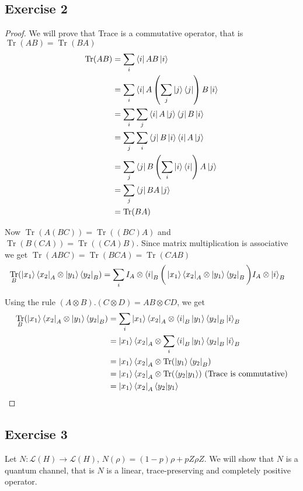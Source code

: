 \documentclass{article}
\DeclareMathOperator{\Tr}{Tr}
\begin{document}
\subsection*{Exercise 2}
\begin{proof}
We will prove that Trace is a commutative operator, that is $\Tr(AB)= \Tr(BA)$
\begin{align*}
    \Tr(AB) &= \sum_i \bra i AB \ket i \\
    &= \sum_i \bra i A \left(\sum_j \ket j \bra j \right)B \ket i \\
    &= \sum_i \sum_j \bra i A \ket j \bra j B \ket i \\
    &= \sum_j \sum_i \bra j B \ket i \bra i A \ket j \\
    &= \sum_j \bra j B \left( \sum_i \ket i \bra i \right) A \ket j \\
    &= \sum_j \bra j BA \ket j \\
    &= \Tr(BA)
\end{align*}

Now $\Tr(A(BC)) = \Tr((BC)A)$ and $\Tr(B(CA)) = \Tr((CA)B)$. Since matrix multiplication is associative we get $\Tr(ABC) = \Tr(BCA) = \Tr(CAB)$ \\

\begin{align*}
    \Tr_B (\ket{x_1} \bra{x_2}_A \otimes \ket{y_1} \bra{y_2}_B) &= \sum_i I_A \otimes \bra{i}_B \bigg( \ket{x_1} \bra{x_2}_A \otimes \ket{y_1} \bra{y_2}_B \bigg) I_A \otimes \ket{i}_B
\end{align*}

Using the rule $(A \otimes B).(C \otimes D) = AB \otimes CD$, we get
\begin{align*}
    \Tr_B (\ket{x_1} \bra{x_2}_A \otimes \ket{y_1} \bra{y_2}_B) &= \sum_i \ket{x_1} \bra{x_2}_A \otimes \bra{i}_B \ket{y_1} \bra{y_2}_B \ket{i}_B \\
    &= \ket{x_1} \bra{x_2}_A \otimes \sum_i \bra{i}_B \ket{y_1} \bra{y_2}_B \ket{i}_B \\
    &= \ket{x_1} \bra{x_2}_A \otimes \Tr (\ket{y_1} \bra{y_2}_B) \\
    &= \ket{x_1} \bra{x_2}_A \otimes \Tr (\braket{y_2 | y_1}) \text{  (Trace is commutative)} \\
    &= \ket{x_1} \bra{x_2}_A \braket{y_2 | y_1}
\end{align*}
\end{proof}

\subsection*{Exercise 3}
Let $N : \mathscr{L}(H) \to \mathscr{L}(H)$, $N(\rho) = (1-p)\rho + p Z \rho Z$. We will show that $N$ is a quantum channel, that is $N$ is a linear, trace-preserving and completely positive operator. \\ 
\end{document}
